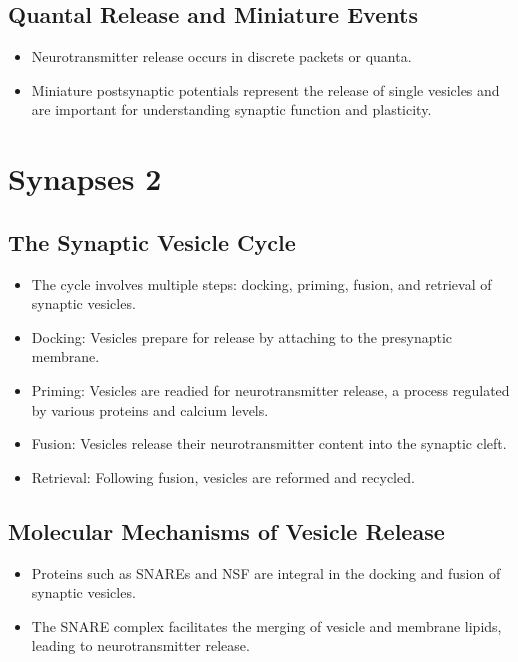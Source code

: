 \documentclass{article}
\begin{document}
\subsection{Quantal Release and Miniature Events}
\begin{itemize}
    \item Neurotransmitter release occurs in discrete packets or quanta.
    \item Miniature postsynaptic potentials represent the release of single vesicles and are important for understanding synaptic function and plasticity.
\end{itemize}

\section{Synapses 2}

\subsection{The Synaptic Vesicle Cycle}
\begin{itemize}
    \item The cycle involves multiple steps: docking, priming, fusion, and retrieval of synaptic vesicles.
    \item Docking: Vesicles prepare for release by attaching to the presynaptic membrane.
    \item Priming: Vesicles are readied for neurotransmitter release, a process regulated by various proteins and calcium levels.
    \item Fusion: Vesicles release their neurotransmitter content into the synaptic cleft.
    \item Retrieval: Following fusion, vesicles are reformed and recycled.
\end{itemize}

\subsection{Molecular Mechanisms of Vesicle Release}
\begin{itemize}
    \item Proteins such as SNAREs and NSF are integral in the docking and fusion of synaptic vesicles.
    \item The SNARE complex facilitates the merging of vesicle and membrane lipids, leading to neurotransmitter release.
\end{itemize}
\end{document}

